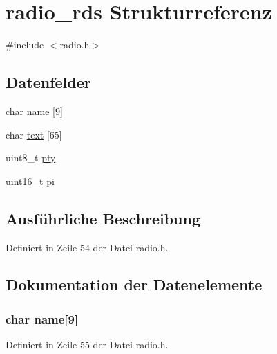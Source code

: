 \hypertarget{structradio__rds}{}\section{radio\+\_\+rds Strukturreferenz}
\label{structradio__rds}


{\ttfamily \#include $<$radio.\+h$>$}

\subsection*{Datenfelder}
\begin{DoxyCompactItemize}
\item 
char \hyperlink{structradio__rds_a00c5e915306c0baea463b99ba6c09c4f}{name} \mbox{[}9\mbox{]}
\item 
char \hyperlink{structradio__rds_a1d7cd4d36a6a2fa49631cef5d5847187}{text} \mbox{[}65\mbox{]}
\item 
uint8\+\_\+t \hyperlink{structradio__rds_acd9e098011d2119e8838cd393abfbcce}{pty}
\item 
uint16\+\_\+t \hyperlink{structradio__rds_ad1803744db28ac0d226ec8da9134598e}{pi}
\end{DoxyCompactItemize}


\subsection{Ausführliche Beschreibung}


Definiert in Zeile 54 der Datei radio.\+h.



\subsection{Dokumentation der Datenelemente}
\hypertarget{structradio__rds_a00c5e915306c0baea463b99ba6c09c4f}{}
\subsubsection[{name}]{\setlength{\rightskip}{0pt plus 5cm}char name\mbox{[}9\mbox{]}}\label{structradio__rds_a00c5e915306c0baea463b99ba6c09c4f}


Definiert in Zeile 55 der Datei radio.\+h.

\hypertarget{structradio__rds_ad1803744db28ac0d226ec8da9134598e}{}
